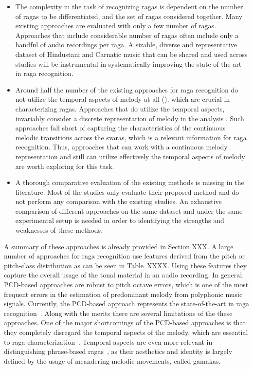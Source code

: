 \begin{itemize}
	\item The complexity in the task of recognizing \glspl{raga} is dependent on the number of \glspl{raga} to be differentiated, and the set of \glspl{raga} considered together. Many existing approaches are evaluated with only a few number of \glspl{raga}. Approaches that include considerable number of \glspl{raga} often include only a handful of audio recordings per \gls{raga}. A sizable, diverse and representative dataset of Hindustani and Carnatic music that can be shared and used across studies will be instrumental in systematically improving the state-of-the-art in \gls{raga} recognition.
	
	\item Around half the number of the existing approaches for \gls{raga} recognition do not utilize the temporal aspects of melody at all (), which are crucial in characterizing \glspl{raga}. Approaches that do utilize the temporal aspects, invariably consider a discrete representation of melody in the analysis . Such approaches fall short of capturing the characteristics of the continuous melodic transitions across the \glspl{svara}, which is a relevant information for \gls{raga} recognition. Thus, approaches that can work with a continuous melody representation and still can utilize effectively the temporal aspects of melody are worth exploring for this task.
	
	\item A thorough comparative  evaluation of the existing methods is missing in the literature. Most of the studies only evaluate their proposed method and do not perform any comparison with the existing studies. An exhaustive comparison of different approaches on the same dataset and under the same experimental setup is needed in order to identifying the strengths and weaknesses of these methods.
	
\end{itemize}

A summary of these approaches is already provided in Section XXX. A large number of approaches for \gls{raga} recognition use features derived from the pitch or pitch-class distribution as can be seen in Table~XXXX. Using these features they capture the overall usage of the tonal material in an audio recording. In general, PCD-based approaches are robust to pitch octave errors, which is one of the most frequent errors in the estimation of predominant melody from polyphonic music signals. Currently, the PCD-based approach represents the state-of-the-art in \gls{raga} recognition~\citep{chordia2013joint}. Along with the merits there are several limitations of the these approaches. One of the major shortcomings of the PCD-based approaches is that they completely disregard the temporal aspects of the melody, which are essential to \gls{raga} characterization~\cite{rao1999raga}. Temporal aspects are even more relevant in distinguishing phrase-based \glspl{raga}~\cite{krishna2012carnatic}, as their aesthetics and identity is largely defined by the usage of meandering melodic movements, called gamakas. 

